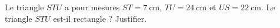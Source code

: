 
\begin{exercice}\label{exosmath-0955}

    Le triangle \( STU\) a pour mesures \( ST=\SI{7}{\centi\meter}\), \( TU=\SI{24}{\centi\meter}\) et \( US=\SI{22}{\centi\meter}\). Le triangle \( STU\) est-il rectangle ? Justifier.

\end{exercice}

